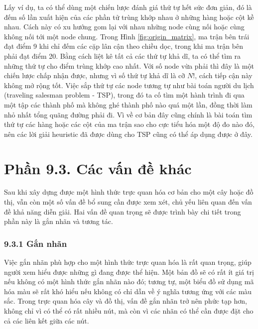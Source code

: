 \documentclass[12pt,a4paper, openany]{book}
\begin{document}
Lấy ví dụ, ta có thể dùng một chiến lược đánh giá thứ tự hết sức đơn giản, đó là đếm số lần xuất hiện của các phần tử trùng khớp nhau ở những hàng hoặc cột kề nhau. Cách này có xu hướng gom lại với nhau những node cùng nối hoặc cùng không nối tới một node chung. Trong Hình \ref{fig:origin_matrix}, ma trận bên trái đạt điểm 9 khi chỉ đếm các cặp lân cận theo chiều dọc, trong khi ma trận bên phải đạt điểm 20. Bằng cách liệt kê tất cả các thứ tự khả dĩ, ta có thể tìm ra những thứ tự cho điểm trùng khớp cao nhất. Với số node vừa phải thì đây là một chiến lược chấp nhận được, nhưng vì số thứ tự khả dĩ là cỡ $N!$, cách tiếp cận này không mở rộng tốt. Việc sắp thứ tự các node tương tự như bài toán người du lịch (traveling salesman problem - TSP), trong đó ta cố tìm một hành trình đi qua một tập các thành phố mà không ghé thành phố nào quá một lần, đồng thời làm nhỏ nhất tổng quãng đường phải đi. Vì về cơ bản đây cũng chính là bài toán tìm thứ tự các hàng hoặc các cột của ma trận sao cho cực tiểu hóa một độ đo nào đó, nên các lời giải heuristic đã được dùng cho TSP cũng có thể áp dụng được ở đây.


\chapter*{Phần 9.3. \newline Các vấn đề khác}

Sau khi xây dựng được một hình thức trực quan hóa cơ bản cho một cây hoặc đồ thị, vẫn còn một số vấn đề bổ sung cần được xem xét, chủ yếu liên quan đến vấn đề khả năng diễn giải. Hai vấn đề quan trọng sẽ được trình bày chi tiết trong phần này là gắn nhãn và tương tác.

\subsection*{9.3.1 Gắn nhãn}

Việc gắn nhãn phù hợp cho một hình thức trực quan hóa là rất quan trọng, giúp người xem hiểu được những gì đang được thể hiện. Một bản đồ sẽ có rất ít giá trị nếu không có một hình thức gắn nhãn nào đó; tương tự, một biểu đồ sử dụng mã hóa màu sẽ rất khó hiểu nếu không có chỉ dẫn về ý nghĩa tương ứng với các màu sắc. Trong trực quan hóa cây và đồ thị, vấn đề gắn nhãn trở nên phức tạp hơn, không chỉ vì có thể có rất nhiều nút, mà còn vì các nhãn có thể cần được đặt cho cả các liên kết giữa các nút.
\end{document}

